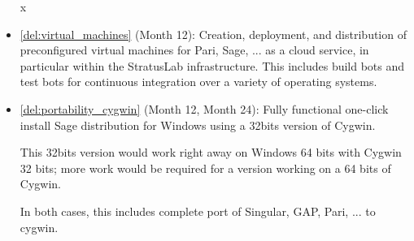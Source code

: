 \begin{Workpackage}{\thewpno}
\begin{WPDeliverables}
\begin{itemize}

x\item \ref{del:virtual_machines} (Month 12): Creation, deployment, and
  distribution of preconfigured virtual machines for Pari, Sage,
  ... as a cloud service, in particular within the StratusLab
  infrastructure. This includes build bots and test bots for
  continuous integration over a variety of operating systems.

\item \ref{del:portability_cygwin} (Month 12, Month 24): Fully
  functional one-click install Sage distribution for Windows using a
  32bits version of Cygwin.

  This 32bits version would work right away on Windows 64 bits with
  Cygwin 32 bits; more work would be required for a version working on
  a 64 bits of Cygwin.

  In both cases, this includes complete port of Singular, GAP, Pari,
  ...  to cygwin.




\end{itemize}
\end{WPDeliverables}
\end{Workpackage}
